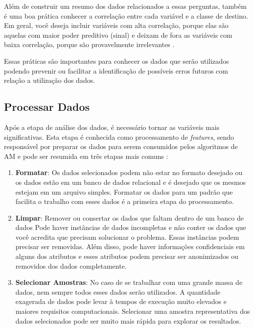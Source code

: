 Além de construir um resumo dos dados relacionados a essas perguntas, também é uma boa prática conhecer a correlação entre cada variável e a classe de destino. Em geral, você deseja incluir variáveis com alta correlação, porque elas são aquelas com maior poder preditivo (sinal) e deixam de fora as variáveis com baixa correlação, porque são provavelmente irrelevantes \cite{Amazon}.

Essas práticas são importantes para conhecer os dados que serão utilizados podendo prevenir ou facilitar a identificação de possíveis erros futuros com relação a utilização dos dados.

\subsection{Processar Dados}

Após a etapa de análise dos dados, é necessário tornar as variáveis mais significativas. Esta etapa é conhecida como processamento de \textit{features}, sendo responsável por preparar os dados para serem consumidos pelos algoritmos de AM e pode ser resumida em três etapas mais comuns \cite{blum1997selection}:

\begin{enumerate}
	\item \textbf{Formatar}: Os dados selecionados podem não estar no formato desejado ou os dados estão em um banco de dados relacional e é desejado que os mesmos estejam em um arquivo simples. Formatar os dados para um padrão que facilita o trabalho com esses dados é a primeira etapa do processamento.
	\item \textbf{Limpar}: Remover ou consertar os dados que faltam dentro de um banco de dados  Pode haver instâncias de dados incompletas e não conter os dados que você acredita que precisam solucionar o problema. Essas instâncias podem precisar ser removidas. Além disso, pode haver informações confidenciais em alguns dos atributos e esses atributos podem precisar ser anonimizados ou removidos dos dados completamente.
	\item \textbf{Selecionar Amostras}: No caso de se trabalhar com uma grande massa de dados, nem sempre todos esses dados serão utilizados. A quantidade exagerada de dados pode levar à tempos de execução muito elevados e maiores requisitos computacionais. Selecionar uma amostra representativa dos dados selecionados pode ser muito mais rápida para explorar os resultados.
\end{enumerate}


